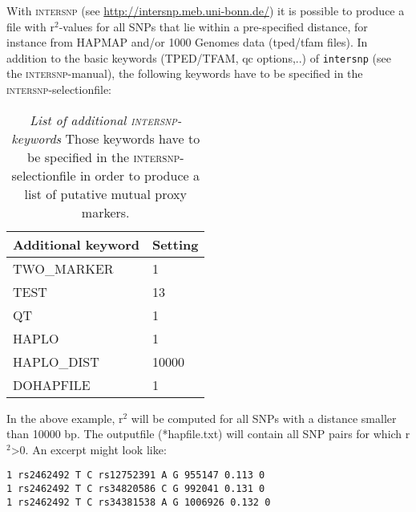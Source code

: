 With \textsc{intersnp} \citep{Herold2009,Becker2010} (see \url{http://intersnp.meb.uni-bonn.de/}) it is possible to produce a file with r$^2$-values for all SNPs that lie within a pre-specified distance, for instance from HAPMAP and/or 1000 Genomes data (tped/tfam files). In addition to the basic keywords (TPED/TFAM, qc options,..) of \texttt{intersnp} (see the \textsc{intersnp}-manual), the following keywords have to be specified in the \textsc{intersnp}-selectionfile:
\begin{table}[H]
 \caption{\emph{List of additional \textsc{intersnp}-keywords} Those keywords have to be specified in the \textsc{intersnp}-selectionfile in order to produce a list of putative mutual proxy markers.}
 \centering
\begin{tabular}{ll}
\rowcolor{light-gray} Additional keyword & Setting\\\hline
TWO\_MARKER & 1\\
TEST & 13\\
QT &1\\
HAPLO & 1\\
HAPLO\_DIST & 10000\\
DOHAPFILE & 1\\
\end{tabular}
\end{table}

In the above example, r$^2$ will be computed for all SNPs with a distance smaller than 10000 bp. The outputfile (*hapfile.txt) will contain all SNP pairs for which r$^2$>0. An excerpt might look like:
\begin{lstlisting}
1 rs2462492 T C rs12752391 A G 955147 0.113 0
1 rs2462492 T C rs34820586 C G 992041 0.131 0
1 rs2462492 T C rs34381538 A G 1006926 0.132 0
\end{lstlisting}

